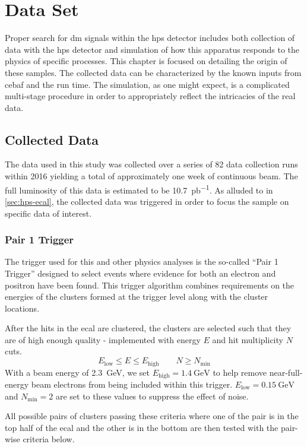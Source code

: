 \chapter{Data Set}
\label{chapter:hps:dataset}

Proper search for \ac{dm} signals within the \ac{hps} detector includes both collection of data
with the \ac{hps} detector and simulation of how this apparatus responds to the physics of specific
processes. This chapter is focused on detailing the origin of these samples. The collected data can
be characterized by the known inputs from \ac{cebaf} and the run time. The simulation, as one might
expect, is a complicated multi-stage procedure in order to appropriately reflect the intricacies of
the real data.

\section{Collected Data} \label{sec:hps:data}
The data used in this study was collected over a series of 82 data collection runs within 2016
yielding a total of approximately one week of continuous beam.
The full luminosity of this data is estimated to be \qty{10.7}{pb^{-1}}.
As alluded to in \cref{sec:hps-ecal}, the collected data was triggered in order to focus the sample on
specific data of interest.

\subsection{Pair 1 Trigger} \label{sec:hps:data:trigger}
The trigger used for this and other physics analyses is the so-called ``Pair 1 Trigger''
designed to select events where evidence for both an electron and positron have been found.
This trigger algorithm combines requirements on the energies of the clusters formed at the trigger
level along with the cluster locations.

After the hits in the \ac{ecal} are clustered, the clusters are selected such that they are of
high enough quality - implemented with energy $E$ and hit multiplicity $N$ cuts.
$$
  E_\mathrm{low} \leq E \leq E_\mathrm{high} \qquad N \geq N_\mathrm{min}
$$
With a beam energy of \qty{2.3}{\GeV}, we set $E_\mathrm{high}=\qty{1.4}{\GeV}$ to help remove
near-full-energy beam electrons from being included within this trigger.
$E_\mathrm{low} = \qty{0.15}{\GeV}$ and $N_\mathrm{min}=2$ are set to these values to suppress
the effect of noise.

All possible pairs of clusters passing these criteria where one of the pair is in the top half of
the \ac{ecal} and the other is in the bottom are then tested with the pair-wise criteria below.

